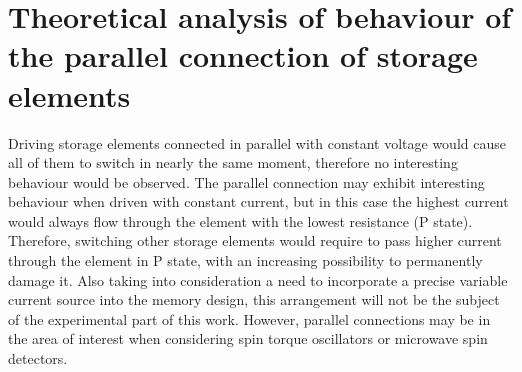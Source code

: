 \section{Theoretical analysis of behaviour of the parallel connection of storage elements} \label{sec:PrinciplesParallel}
    
    Driving storage elements connected in parallel with constant voltage would cause all of them to switch in nearly the same moment, therefore no interesting behaviour would be observed. The parallel connection may exhibit interesting behaviour when driven with constant current, but in this case the highest current would always flow through the element with the lowest resistance (P state). Therefore, switching other storage elements would require to pass higher current through the element in P state, with an increasing possibility to permanently damage it. Also taking into consideration a need to incorporate a precise variable current source into the memory design, this arrangement will not be the subject of the experimental part of this work. However, parallel connections may be in the area of interest when considering spin torque oscillators or microwave spin detectors.
    